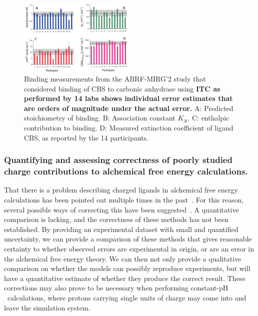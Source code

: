 \documentclass[10pt,final]{article}
\newcommand{\pH}{p$\mathrm{H}$\ }
\begin{document}
\begin{figure}[H]
	\centering
	\includegraphics[width=0.49\textwidth]{figures/cbs_ca_II.PNG}
	\caption{Binding measurements from the ABRF-MIRG'2 study that considered binding of CBS to carbonic anhydrase using \textbf{ITC as performed by 14 labs shows individual error estimates that are orders of magnitude under the actual error.} A: Predicted stoichiometry of binding. B: Association constant $K_\mathrm{A}$. C: enthalpic contribution to binding. D: Measured extinction coefficient of ligand CBS, as reported by the 14 participants.~\autocite{Myszka2003a}}
	\label{figure:abrf-mirg2}
\end{figure}

\subsubsection*{Quantifying and assessing correctness of poorly studied charge contributions to alchemical free energy calculations.}
That there is a problem describing charged ligands in alchemical free energy calculations has been pointed out multiple times in the past~\autocite{Rocklin2013b,Muddana2014a}. 
%
For this reason, several possible ways of correcting this have been suggested~\autocite{Reif2013a,Rocklin2013a}. A quantitative comparison is lacking, and the correctness of these methods has not been established.
%
By providing an experimental dataset with small and quantified uncertainty, we can provide a comparison of these methods that gives reasonable certainty to whether observed errors are experimental in origin, or are an error in the alchemical free energy theory. 
%
We can then not only provide a qualitative comparison on whether the models can possibly reproduce experiments, but will have a quantitative estimate of whether they produce the correct result.
%
These corrections may also prove to be necessary when performing constant-\pH calculations, where protons carrying single units of charge may come into and leave the simulation system.
\end{document}

